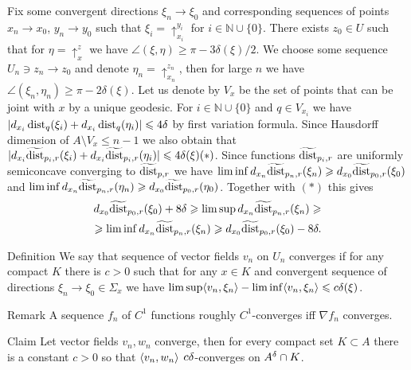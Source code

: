 Fix some convergent directions $\xi_n\to\xi_0$ and
corresponding sequences of points
$x_n\to x_0$, $y_n\to y_0$
such that  $\xi_i=\uparrow_{x_i}^{y_i}$ for $i\in\mathbb N\cup\{0\}$.
There exists $z_0 \in U$ such that for $\eta=\uparrow_x^z$ 
we have
$\angle(\xi,\eta)\ge \pi-3\delta(\xi)/2$.
We choose some sequence 
$U_n\ni z_n\to z_0$
and denote
$\eta_n=\uparrow_{x_n}^{z_n}$,
then for large $n$ we have $\angle(\xi_n,\eta_n)\ge \pi-2\delta(\xi)$.
Let us denote by $V_x$ be the set of points that can be joint with $x$
by a unique geodesic. For $i\in\mathbb N\cup\{0\}$ and
$q\in V_{x_i}$ we have $|d_{x_i} \operatorname{dist}_q(\xi_i)+d_{x_i} \operatorname{dist}_q(\eta_i)|\leqslant 4\delta$ by first
variation formula.
Since Hausdorff dimension of $A\setminus V_x\le n-1$ we also obtain
that
$|d_{x_i} \widetilde{\operatorname{dist}}_{p_i,r}(\xi_i)+d_{x_i} \widetilde{\operatorname{dist}}_{p_i,r}(\eta_i)|\leqslant 4\delta(\xi) (*)$.
Since functions
$\widetilde{\operatorname{dist}}_{p_i,r}$ are uniformly semiconcave converging to
$\widetilde{\operatorname{dist}}_{p,r}$ we have
$\liminf d_{x_n}\widetilde{\operatorname{dist}}_{p_n,r}(\xi_n)\geqslant d_{x_0}\widetilde{\operatorname{dist}}_{p_0,r}(\xi_0)$ and $\liminf d_{x_n}\widetilde{\operatorname{dist}}_{p_n,r}(\eta_n)\geqslant d_{x_0}\widetilde{\operatorname{dist}}_{p_0,r}(\eta_0)$.
Together with $(*)$ this gives
\begin{align*}
 d_{x_0}\widetilde{\operatorname{dist}}_{p_0,r}(\xi_0)+8\delta\geqslant
\limsup d_{x_n}\widetilde{\operatorname{dist}}_{p_n,r}(\xi_n)\geqslant\\
\geqslant
\liminf d_{x_n}\widetilde{\operatorname{dist}}_{p_n,r}(\xi_n)\geqslant d_{x_0}\widetilde{\operatorname{dist}}_{p_0,r}(\xi_0)-8\delta.
\end{align*}

\begin{thm}{Definition}
We say that sequence of vector fields $v_n$ on $U_n$
converges if for any compact $K$ there is $c>0$ such that
for any $x\in K$ and convergent sequence of directions $\xi_n\to\xi_0\in \Sigma_x$ we have
$\limsup \langle v_n,\xi_n\rangle-\liminf \langle v_n,\xi_n\rangle\leqslant c\delta(\xi)$.



\end{thm}

\begin{thm}{Remark}
A sequence $f_n$ of $C^1$ functions roughly $C^1$-converges
iff $\nabla f_n$ converges.

\end{thm}


\begin{thm}{Claim}\label{lem:scalprod}
Let vector fields $v_n, w_n$ converge, then for every compact
set $K\subset A$ there is a constant $c>0$ so that
$\langle v_n, w_n\rangle$ $c\delta$-converges on $A^\delta\cap K$.
\end{thm}

